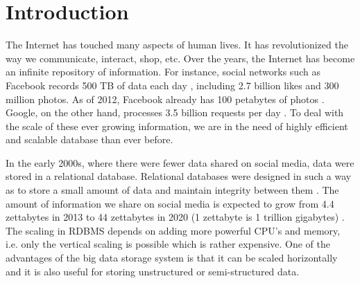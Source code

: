 \documentclass[11pt,a4paper,bibtotoc,idxtotoc,headsepline,footsepline,footexclude,BCOR12mm,DIV13]{scrbook}
\begin{document}
	\frontmatter
	
	
	
	
	
%	
	\clearemptydoublepage
	
	
	
	
	
	
	
	
	

	\tableofcontents


  

	\mainmatter
	
	



\chapter{Introduction}
\label{chap:introduction}

The Internet has touched many aspects of human lives. It has revolutionized the way we communicate, interact, shop, etc. Over the years, the Internet has become an infinite repository of information. For instance, social networks such as Facebook records 500 TB of data each day \cite{daniel:datastats}, including 2.7 billion likes and 300 million photos. As of 2012, Facebook already has 100 petabytes of photos \cite{daniel:datastats}. Google, on the other hand, processes 3.5 billion requests per day \cite{daniel:datastats}. To deal with the scale of these ever growing information, we are in the need of highly efficient and scalable database than ever before. 

In the early 2000s, where there were fewer data shared on social media, data were stored in a relational database. Relational databases were designed in such a way as to store a small amount of data and maintain integrity between them \cite{matt:rdb}. The amount of information we share on social media is expected to grow from 4.4 zettabytes in 2013 to 44 zettabytes in 2020 (1 zettabyte is 1 trillion gigabytes) \cite{matt:rdb}. The scaling in RDBMS depends on adding more powerful CPU's and memory, i.e. only the vertical scaling is possible which is rather expensive.  One of the advantages of the big data storage system is that it can be scaled horizontally and it is also useful for storing unstructured or semi-structured data. 
\end{document}
